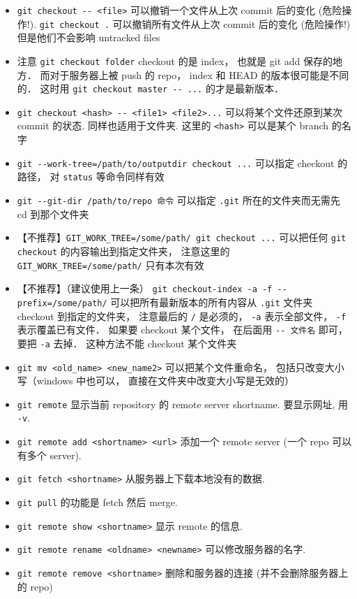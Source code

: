 \begin{itemize}
\item \verb|git checkout -- <file>| 可以撤销一个文件从上次 commit 后的变化 (危险操作!). \verb|git checkout .| 可以撤销所有文件从上次 commit 后的变化 (危险操作!) 但是他们不会影响 untracked files
\item 注意 \verb|git checkout folder| checkout 的是 index， 也就是 git add 保存的地方． 而对于服务器上被 push 的 repo， index 和 HEAD 的版本很可能是不同的． 这时用 \verb|git checkout master -- ...| 的才是最新版本．
\item \verb|git checkout <hash> -- <file1> <file2>...| 可以将某个文件还原到某次 commit 的状态. 同样也适用于文件夹. 这里的 \verb|<hash>| 可以是某个 branch 的名字
\item \verb|git --work-tree=/path/to/outputdir checkout ...| 可以指定 checkout 的路径， 对 \verb|status| 等命令同样有效
\item \verb|git --git-dir /path/to/repo 命令| 可以指定 \verb|.git| 所在的文件夹而无需先 cd 到那个文件夹
\item 【不推荐】\verb|GIT_WORK_TREE=/some/path/ git checkout ...| 可以把任何 \verb|git checkout| 的内容输出到指定文件夹， 注意这里的 \verb|GIT_WORK_TREE=/some/path/| 只有本次有效
\item 【不推荐】（建议使用上一条） \verb|git checkout-index -a -f --prefix=/some/path/| 可以把所有最新版本的所有内容从 \verb|.git| 文件夹 checkout 到指定的文件夹， 注意最后的 \verb|/| 是必须的， \verb|-a| 表示全部文件， \verb|-f| 表示覆盖已有文件． 如果要 checkout 某个文件， 在后面用 \verb|-- 文件名| 即可， 要把 \verb|-a| 去掉． 这种方法不能 checkout 某个文件夹
\item \verb|git mv <old_name> <new_name2>| 可以把某个文件重命名， 包括只改变大小写（windows 中也可以， 直接在文件夹中改变大小写是无效的）
\item \verb|git remote| 显示当前 repository 的 remote server shortname. 要显示网址, 用 \verb|-v|.
\item \verb|git remote add <shortname> <url>| 添加一个 remote server (一个 repo 可以有多个 server).
\item \verb|git fetch <shortname>| 从服务器上下载本地没有的数据.
\item \verb|git pull| 的功能是 fetch 然后 merge.
\item \verb|git remote show <shortname>| 显示 remote 的信息.
\item \verb|git remote rename <oldname> <newname>| 可以修改服务器的名字.
\item \verb|git remote remove <shortname>| 删除和服务器的连接 (并不会删除服务器上的 repo)

\end{itemize}
